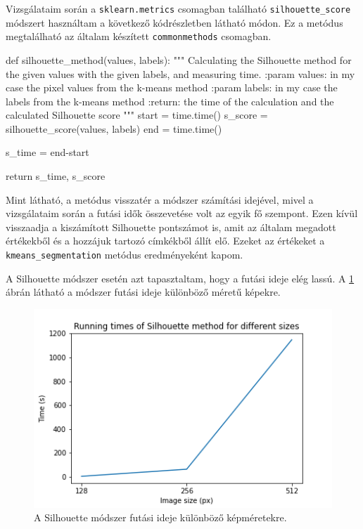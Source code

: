 Vizsgálataim során a \texttt{sklearn.metrics} csomagban található \texttt{silhouette\_score} módszert használtam a következő kódrészletben látható módon. Ez a metódus megtalálható az általam készített \texttt{commonmethods} csomagban.
\begin{python}
def silhouette_method(values, labels):
    """
    Calculating the Silhouette method for the given values with
    the given labels, and measuring time.
    :param values: in my case the pixel values from the k-means method
    :param labels: in my case the labels from the k-means method
    :return: the time of the calculation and
        the calculated Silhouette score
    """
    start = time.time()
    s_score = silhouette_score(values, labels)
    end = time.time()

    s_time = end-start

    return s_time, s_score
\end{python}
Mint látható, a metódus visszatér a módszer számítási idejével, mivel a vizsgálataim során a futási idők összevetése volt az egyik fő szempont. Ezen kívül visszaadja a kiszámított Silhouette pontszámot is, amit az általam megadott értékekből és a hozzájuk tartozó címkékből állít elő. Ezeket az értékeket a \texttt{kmeans\_segmentation} metódus eredményeként kapom.

A Silhouette módszer esetén azt tapasztaltam, hogy a futási ideje elég lassú. A \ref{fig:silhouette_runtime} ábrán látható a módszer futási ideje különböző méretű képekre.

\begin{figure}[h]
\centering
\includegraphics[scale=0.9]{images/silhouette_runtime.png}
\caption{A Silhouette módszer futási ideje különböző képméretekre.}
\label{fig:silhouette_runtime}
\end{figure}

